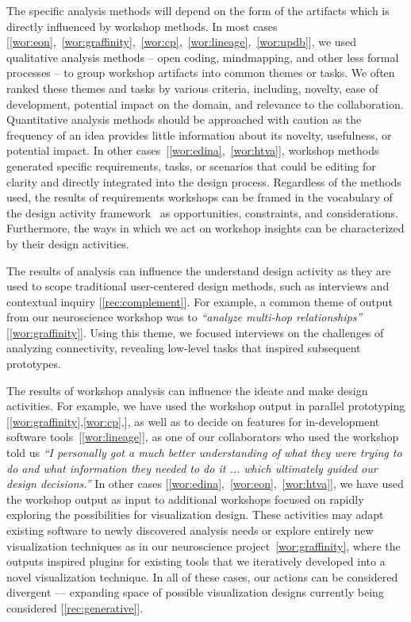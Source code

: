 The specific analysis methods will depend on the form of the artifacts which is directly influenced by workshop methods. In most cases [\ref{wor:eon},~\ref{wor:graffinity},~\ref{wor:cp},~\ref{wor:lineage},~\ref{wor:updb}],  we used qualitative analysis methods -- open coding, mindmapping, and other less formal processes -- to group workshop artifacts into common themes or tasks. We often ranked these themes and tasks by various criteria, including, novelty, ease of development, potential impact on the domain, and relevance to the collaboration. Quantitative analysis methods should be approached with caution as the frequency of an idea provides little information about its novelty, usefulness, or potential impact. In other cases~[\ref{wor:edina},~\ref{wor:htva}], workshop methods generated specific requirements, tasks, or scenarios that could be editing for clarity and directly integrated into the design process. Regardless of the methods used, the results of requirements workshops can be framed in the vocabulary of the design activity framework~\cite{McKenna2014} as opportunities, constraints, and considerations. Furthermore, the ways in which we act on workshop insights can be characterized by their design activities.

The results of analysis can influence the understand design activity as they are used to scope traditional  user-centered design methods, such as interviews and contextual inquiry [\ref{rec:complement}]. For example, a common theme of output from our neuroscience workshop was to \emph{``analyze multi-hop relationships''} [\ref{wor:graffinity}]. Using this theme, we focused interviews on the challenges of analyzing connectivity, revealing low-level tasks that inspired subsequent prototypes.

The results of workshop analysis can influence the ideate and make design activities. For example, we have used the workshop output in parallel prototyping [\ref{wor:graffinity},\ref{wor:cp},], as well as to decide on features for in-development software tools~[\ref{wor:lineage}], as one of our collaborators who used the workshop told us \emph{``I personally got a much better understanding of what they were trying to do and what information they needed to do it ... which ultimately guided our design decisions.''} In other cases [\ref{wor:edina},~\ref{wor:eon},~\ref{wor:htva}], we have used the workshop output as input to additional workshops focused on rapidly exploring the possibilities for visualization design. These activities may adapt existing software to newly discovered analysis needs or explore entirely new visualization techniques as in our neuroscience project~\ref{wor:graffinity}, where the outputs inspired plugins for existing tools that we iteratively developed into a novel visualization technique. In all of these cases, our actions can be considered divergent --- expanding space of possible visualization designs currently being considered [\ref{rec:generative}].

